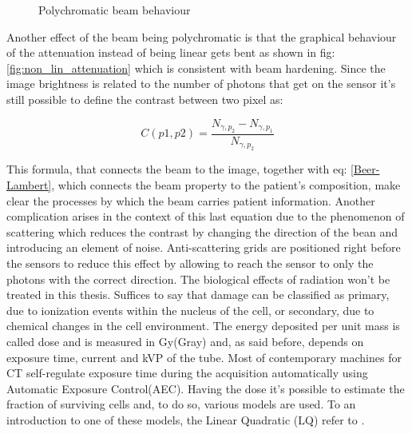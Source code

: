 \begin{figure}[H]
\centering
        \caption{Polychromatic beam behaviour}\label{fig:polychrom_behaviour}
\end{figure}

Another effect of the beam being polychromatic is that the graphical behaviour of the attenuation instead of being linear gets bent as shown in fig: \ref{fig:non_lin_attenuation} which is consistent with beam hardening. Since the image brightness is related to the number of photons that get on the sensor it's still possible to define the contrast between two pixel as:

\begin{equation}
C(p1,p2) = \frac{N_{\gamma ,p_2}-N_{\gamma ,p_1}}{N_{\gamma ,p_2}}
\end{equation}

This formula, that connects the beam to the image, together with eq: \ref{Beer-Lambert}, which connects the beam property to the patient's composition, make clear the processes by which the beam carries patient information. Another complication arises in the context of this last equation due to the phenomenon of scattering which reduces the contrast by changing the direction of the bean and introducing an element of noise. Anti-scattering grids are positioned right before the sensors to reduce this effect by allowing to reach the sensor to only the photons with the correct direction.
\newline The biological effects of radiation won't be treated in this thesis. Suffices to say that damage can be classified as primary, due to ionization events within the nucleus of the cell, or secondary, due to chemical changes in the cell environment. The energy deposited per unit mass is called dose and is measured in Gy(Gray) and, as said before, depends on exposure time, current and kVP of the tube. Most of contemporary machines for CT self-regulate exposure time during the acquisition automatically using Automatic Exposure Control(AEC). Having the dose it's possible to estimate the fraction of surviving cells and, to do so, various models are used. To an introduction to one of these models, the Linear Quadratic (LQ) refer to \cite{LQ_model}.\newline 

